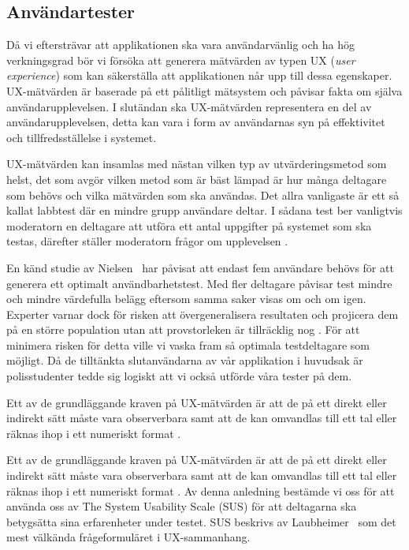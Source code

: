 \documentclass[swedish]{maucsthesis}
\begin{document}

\subsection{Användartester}

Då vi eftersträvar att applikationen ska vara användarvänlig och ha hög verkningsgrad bör vi
försöka att generera mätvärden av typen UX (\textit {user experience}) som kan säkerställa
att applikationen når upp till dessa egenskaper. UX-mätvärden är baserade på ett
pålitligt mätsystem och påvisar fakta om själva användarupplevelsen. I slutändan
ska UX-mätvärden representera en del av användarupplevelsen, detta kan vara i
form av användarnas syn på effektivitet och tillfredsställelse i systemet.

UX-mätvärden kan insamlas med nästan vilken typ av utvärderingsmetod som helst,
det som avgör vilken metod som är bäst lämpad är hur många deltagare som behövs
och vilka mätvärden som ska användas. Det allra vanligaste är ett så kallat
labbtest där en mindre grupp användare deltar. I sådana test ber vanligtvis
moderatorn en deltagare att utföra ett antal uppgifter på systemet som ska
testas, därefter ställer moderatorn frågor om upplevelsen \cite{tullis:2013}.

En känd studie av Nielsen~\cite{nielsen:2000} har påvisat att endast fem användare
behövs för att generera ett optimalt användbarhetstest. Med fler deltagare
påvisar test mindre och mindre värdefulla belägg eftersom samma saker visas om
och om igen. Experter varnar dock för risken att övergeneralisera resultaten och
projicera dem på en större population utan att provstorleken är tillräcklig nog
\cite{tullis:2013}. För att minimera risken för detta ville vi vaska fram så
optimala testdeltagare som möjligt. Då de tilltänkta slutanvändarna av vår
applikation i huvudsak är polisstudenter tedde sig logiskt att vi också
utförde våra tester på dem.

Ett av de grundläggande kraven på UX-mätvärden är att de på ett direkt eller
indirekt sätt måste vara observerbara samt att de kan omvandlas till ett tal
eller räknas ihop i ett numeriskt format \cite{tullis:2013}.

Ett av de grundläggande kraven på UX-mätvärden är att de på ett direkt eller
indirekt sätt måste vara observerbara samt att de kan omvandlas till ett tal
eller räknas ihop i ett numeriskt format \cite{tullis:2013}. Av denna anledning
bestämde vi oss för att använda oss av The System Usability Scale (SUS) för att
deltagarna ska betygsätta sina erfarenheter under testet. SUS beskrivs av
Laubheimer~\cite{laubheimer:2018} som det mest välkända frågeformuläret i UX-sammanhang.
\end{document}
